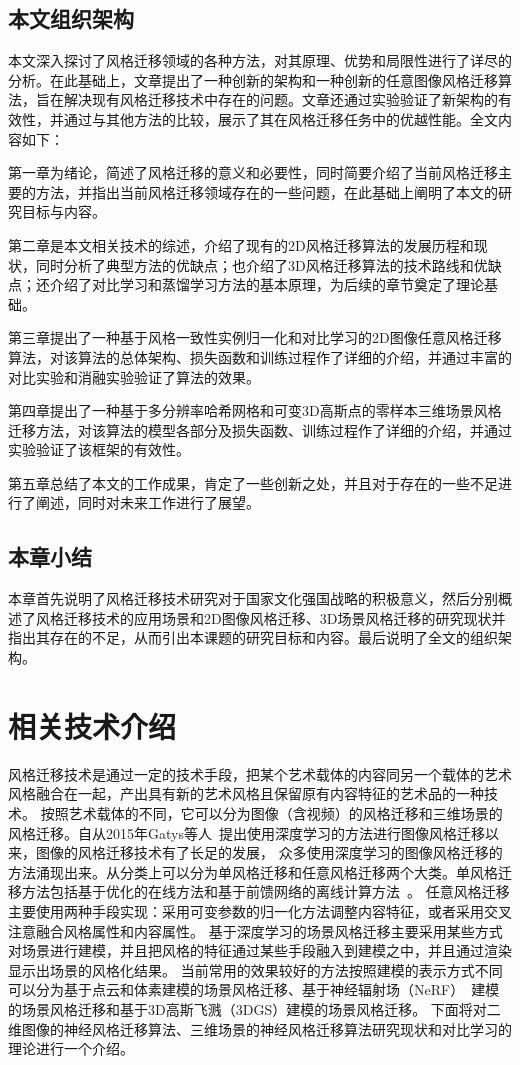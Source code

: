 \section{本文组织架构}
本文深入探讨了风格迁移领域的各种方法，对其原理、优势和局限性进行了详尽的分析。在此基础上，文章提出了一种创新的架构和一种创新的任意图像风格迁移算法，旨在解决现有风格迁移技术中存在的问题。文章还通过实验验证了新架构的有效性，并通过与其他方法的比较，展示了其在风格迁移任务中的优越性能。全文内容如下：
\par 第一章为绪论，简述了风格迁移的意义和必要性，同时简要介绍了当前风格迁移主要的方法，并指出当前风格迁移领域存在的一些问题，在此基础上阐明了本文的研究目标与内容。 
\par 第二章是本文相关技术的综述，介绍了现有的2D风格迁移算法的发展历程和现状，同时分析了典型方法的优缺点；也介绍了3D风格迁移算法的技术路线和优缺点；还介绍了对比学习和蒸馏学习方法的基本原理，为后续的章节奠定了理论基础。
\par 第三章提出了一种基于风格一致性实例归一化和对比学习的2D图像任意风格迁移算法，对该算法的总体架构、损失函数和训练过程作了详细的介绍，并通过丰富的对比实验和消融实验验证了算法的效果。
\par 第四章提出了一种基于多分辨率哈希网格和可变3D高斯点的零样本三维场景风格迁移方法，对该算法的模型各部分及损失函数、训练过程作了详细的介绍，并通过实验验证了该框架的有效性。
\par 第五章总结了本文的工作成果，肯定了一些创新之处，并且对于存在的一些不足进行了阐述，同时对未来工作进行了展望。

\section{本章小结}
本章首先说明了风格迁移技术研究对于国家文化强国战略的积极意义，然后分别概述了风格迁移技术的应用场景和2D图像风格迁移、3D场景风格迁移的研究现状并指出其存在的不足，从而引出本课题的研究目标和内容。最后说明了全文的组织架构。  

\chapter{相关技术介绍}
风格迁移技术是通过一定的技术手段，把某个艺术载体的内容同另一个载体的艺术风格融合在一起，产出具有新的艺术风格且保留原有内容特征的艺术品的一种技术。
按照艺术载体的不同，它可以分为图像（含视频）的风格迁移和三维场景的风格迁移。自从2015年Gatys等人~\cite{gatys2016image}提出使用深度学习的方法进行图像风格迁移以来，图像的风格迁移技术有了长足的发展，
众多使用深度学习的图像风格迁移的方法涌现出来。从分类上可以分为单风格迁移和任意风格迁移两个大类。单风格迁移方法包括基于优化的在线方法和基于前馈网络的离线计算方法~\cite{jing2019neural}。
任意风格迁移主要使用两种手段实现：采用可变参数的归一化方法调整内容特征，或者采用交叉注意融合风格属性和内容属性。
基于深度学习的场景风格迁移主要采用某些方式对场景进行建模，并且把风格的特征通过某些手段融入到建模之中，并且通过渲染显示出场景的风格化结果。
当前常用的效果较好的方法按照建模的表示方式不同可以分为基于点云和体素建模的场景风格迁移、基于神经辐射场（NeRF）~\cite{mildenhall2021nerf}建模的场景风格迁移和基于3D高斯飞溅（3DGS）建模的场景风格迁移。
下面将对二维图像的神经风格迁移算法、三维场景的神经风格迁移算法研究现状和对比学习的理论进行一个介绍。
